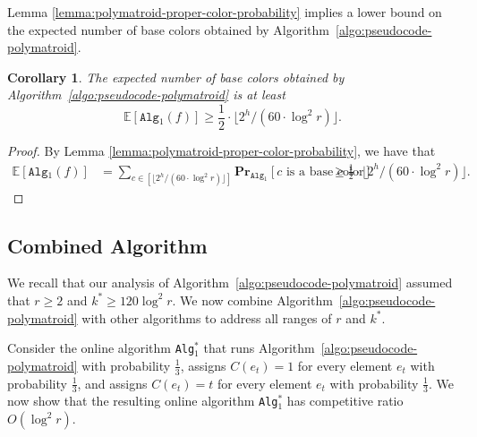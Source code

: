 \documentclass[11pt]{article}
\newtheorem{corollary}{Corollary}
\theoremstyle{definition}
\begin{document}
Lemma \ref{lemma:polymatroid-proper-color-probability} implies a lower bound on the expected number of base colors obtained by Algorithm~\ref{algo:pseudocode-polymatroid}.

\begin{corollary}\label{corollary:number-proper-colors}
    The expected number of base colors obtained by Algorithm~\ref{algo:pseudocode-polymatroid} is at least $$\mathbb{E}[\texttt{Alg$_1$}(f)]\geq \frac{1}{2}\cdot \lfloor 2^h/ (60\cdot \log^2 r)\rfloor.$$
\end{corollary}
\begin{proof}
By Lemma \ref{lemma:polymatroid-proper-color-probability}, we have that 
    $$\begin{aligned}
        \mathbb{E}[\texttt{Alg$_1$}(f)] &= \sum_{c\in [\lfloor 2^h/ (60\cdot \log^2 r)\rfloor]} \mathbf{Pr}_{\texttt{Alg$_1$} }[c \text{ is a base color}] 
&\ge \frac{1}{2}\cdot \lfloor 2^h/ (60\cdot \log^2 r)\rfloor.
    \end{aligned}$$
\end{proof}



\subsection{Combined Algorithm}\label{subsection:mixed-algorithm}
We recall that our analysis of Algorithm~\ref{algo:pseudocode-polymatroid} assumed that $r\geq 2$ and $k^*\geq 120\log^2 r$. We now combine Algorithm~\ref{algo:pseudocode-polymatroid} with other algorithms to address all ranges of $r$ and $k^*$.

Consider the online algorithm \texttt{Alg$_1^*$} that runs Algorithm~\ref{algo:pseudocode-polymatroid} with probability $\frac{1}{3}$, assigns $C(e_t)=1$ for every element $e_t$ with probability $\frac{1}{3}$, and assigns $C(e_t)=t$ for every element $e_t$ with probability $\frac{1}{3}$. We now show that the resulting online algorithm \texttt{Alg$_1^*$} has competitive ratio $O(\log^2 r)$.
\end{document}
